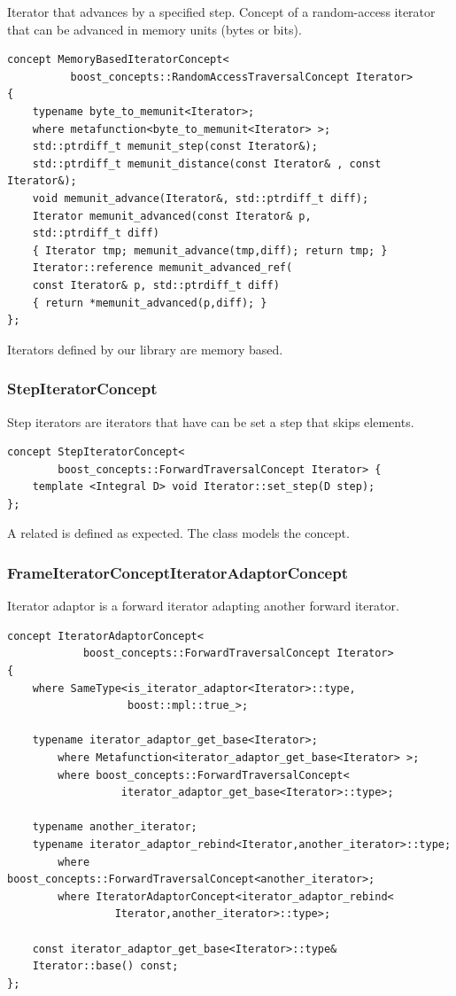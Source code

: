 Iterator that advances by a specified step. Concept of a random-access
iterator that can be advanced in memory units (bytes or bits).

\begin{lstlisting}
concept MemoryBasedIteratorConcept<
          boost_concepts::RandomAccessTraversalConcept Iterator> 
{
    typename byte_to_memunit<Iterator>;
    where metafunction<byte_to_memunit<Iterator> >;
    std::ptrdiff_t memunit_step(const Iterator&);
    std::ptrdiff_t memunit_distance(const Iterator& , const Iterator&);
    void memunit_advance(Iterator&, std::ptrdiff_t diff);
    Iterator memunit_advanced(const Iterator& p,
    std::ptrdiff_t diff)
    { Iterator tmp; memunit_advance(tmp,diff); return tmp; }
    Iterator::reference memunit_advanced_ref(
    const Iterator& p, std::ptrdiff_t diff) 
    { return *memunit_advanced(p,diff); }
};
\end{lstlisting}

Iterators defined by our library are memory based.

\subsubsection{StepIteratorConcept}

Step iterators are iterators that have can be set a step that skips
elements.

\begin{lstlisting}
concept StepIteratorConcept<
        boost_concepts::ForwardTraversalConcept Iterator> {
    template <Integral D> void Iterator::set_step(D step);
};
\end{lstlisting}

A related  is defined as expected.
The class  models the concept.

\subsubsection{FrameIteratorConceptIteratorAdaptorConcept}

Iterator adaptor is a forward iterator adapting another forward
iterator.

\begin{lstlisting}
concept IteratorAdaptorConcept<
            boost_concepts::ForwardTraversalConcept Iterator> 
{
    where SameType<is_iterator_adaptor<Iterator>::type, 
                   boost::mpl::true_>;

    typename iterator_adaptor_get_base<Iterator>;
        where Metafunction<iterator_adaptor_get_base<Iterator> >;
        where boost_concepts::ForwardTraversalConcept<
                  iterator_adaptor_get_base<Iterator>::type>;
    
    typename another_iterator; 
    typename iterator_adaptor_rebind<Iterator,another_iterator>::type;
        where boost_concepts::ForwardTraversalConcept<another_iterator>;
        where IteratorAdaptorConcept<iterator_adaptor_rebind<
                 Iterator,another_iterator>::type>;

    const iterator_adaptor_get_base<Iterator>::type&
    Iterator::base() const;
};
\end{lstlisting}


